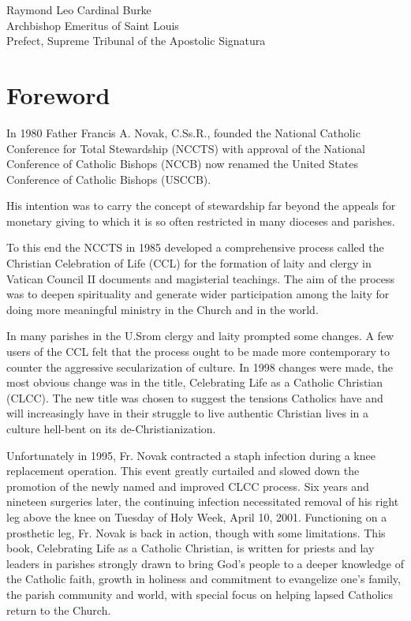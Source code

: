 \documentclass[oneside]{book}
\begin{document}
Raymond Leo Cardinal Burke \\
Archbishop Emeritus of Saint Louis \\
Prefect, Supreme Tribunal of the Apostolic Signatura

\pagebreak


\chapter{Foreword}


In 1980 Father Francis A. Novak, C.Ss.R., founded the National Catholic
Conference for Total Stewardship (NCCTS) with approval of the National
Conference of Catholic Bishops (NCCB) now renamed the United States Conference
of Catholic Bishops (USCCB).

His intention was to carry the concept of stewardship far beyond the appeals for
monetary giving to which it is so often restricted in many dioceses and
parishes.

To this end the NCCTS in 1985 developed a comprehensive process called the
Christian Celebration of Life (CCL) for the formation of laity and clergy in
Vatican Council II documents and magisterial teachings. The aim of the process
was to deepen spirituality and generate wider participation among the laity for
doing more meaningful ministry in the Church and in the world.

In many parishes in the U.Srom clergy and laity prompted some changes. A few
users of the CCL felt that the process ought to be made more contemporary to
counter the aggressive secularization of culture. In 1998 changes were made, the
most obvious change was in the title, Celebrating Life as a Catholic Christian
(CLCC). The new title was chosen to suggest the tensions Catholics have and will
increasingly have in their struggle to live authentic Christian lives in a
culture hell-bent on its de-Christianization.

Unfortunately in 1995, Fr. Novak contracted a staph infection during a knee
replacement operation. This event greatly curtailed and slowed down the
promotion of the newly named and improved CLCC process. Six years and nineteen
surgeries later, the continuing infection necessitated removal of his right leg
above the knee on Tuesday of Holy Week, April 10, 2001.  Functioning on a
prosthetic leg, Fr. Novak is back in action, though with some limitations. This
book, Celebrating Life as a Catholic Christian, is written for priests and lay
leaders in parishes strongly drawn to bring God's people to a deeper knowledge
of the Catholic faith, growth in holiness and commitment to evangelize one's
family, the parish community and world, with special focus on helping lapsed
Catholics return to the Church.
\end{document}
